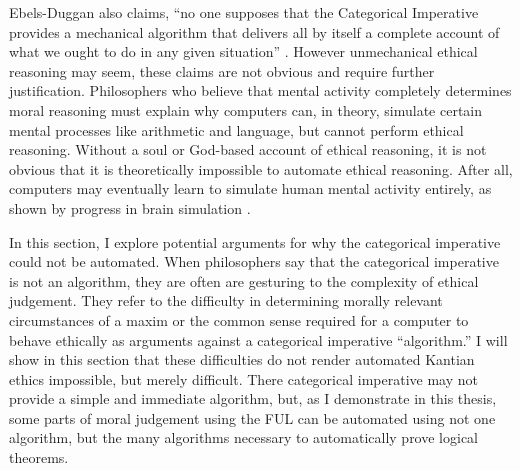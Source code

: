 \begin{isabellebody}
\begin{isamarkuptext}
Ebels-Duggan also claims, ``no one supposes that the Categorical Imperative provides a mechanical 
algorithm that delivers all by itself a complete account of what we ought to do in any given 
situation'' \citep[174]{ebelsduggan}. However unmechanical ethical reasoning
may seem, these claims are not obvious and require further justification. Philosophers who believe 
that mental activity completely determines moral reasoning must explain why computers can, in theory, 
simulate certain mental processes like arithmetic and language, but cannot perform ethical reasoning. 
Without a soul or God-based account of ethical reasoning, it is not obvious that it is theoretically 
impossible to automate ethical reasoning. After all, computers may eventually learn to simulate human 
mental activity entirely, as shown by progress in brain simulation \citep{brainsimulation}. 

In this section, I explore potential arguments for why the categorical imperative could not be automated. When 
philosophers say that the categorical imperative is not an algorithm, they are often are gesturing to the complexity
of ethical judgement. They refer to the difficulty in determining morally relevant circumstances of a maxim or the common 
sense required for a computer to behave ethically as arguments against a categorical imperative ``algorithm.'' 
I will show in this section that these difficulties do not render automated Kantian ethics impossible, but 
merely difficult. There categorical imperative may not provide a simple and immediate algorithm, but, as
I demonstrate in this thesis, some parts of moral judgement using the FUL can be automated using not one
algorithm, but the many algorithms necessary to automatically prove logical theorems.


\end{isamarkuptext}
\end{isabellebody}
